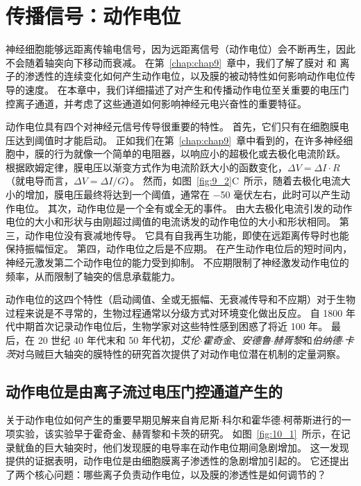 \chapter{传播信号：动作电位} \label{chap:chap10}

神经细胞能够远距离传输电信号，因为远距离信号（动作电位）会不断再生，因此不会随着轴突向下移动而衰减。
在第~\ref{chap:chap9}~章中，我们了解了膜对  和  离子的渗透性的连续变化如何产生动作电位，以及膜的被动特性如何影响动作电位传导的速度。
在本章中，我们详细描述了对产生和传播动作电位至关重要的电压门控离子通道，并考虑了这些通道如何影响神经元电兴奋性的重要特征。


动作电位具有四个对神经元信号传导很重要的特性。
首先，它们只有在细胞膜电压达到阈值时才能启动。
正如我们在第~\ref{chap:chap9}~章中看到的，在许多神经细胞中，膜的行为就像一个简单的电阻器，以响应小的超极化或去极化电流阶跃。
根据欧姆定律，膜电压以渐变方式作为电流阶跃大小的函数变化，$\Delta V = \Delta I \cdot R$（就电导而言，$\Delta V = \Delta I / G$）。
然而，如图~\ref{fig:9_2}C~所示，随着去极化电流大小的增加，膜电压最终将达到一个阈值，通常在 −50 毫伏左右，此时可以产生动作电位。
其次，动作电位是一个全有或全无的事件。
由大去极化电流引发的动作电位的大小和形状与由刚超过阈值的电流诱发的动作电位的大小和形状相同。
第三，动作电位没有衰减地传导。
它具有自我再生功能，即使在远距离传导时也能保持振幅恒定。
第四，动作电位之后是不应期。
在产生动作电位后的短时间内，神经元激发第二个动作电位的能力受到抑制。
不应期限制了神经激发动作电位的频率，从而限制了轴突的信息承载能力。


动作电位的这四个特性（启动阈值、全或无振幅、无衰减传导和不应期）对于生物过程来说是不寻常的，生物过程通常以分级方式对环境变化做出反应。
自 1800 年代中期首次记录动作电位后，生物学家对这些特性感到困惑了将近 100 年。
最后，在 20 世纪 40 年代末和 50 年代初，\textit{艾伦$\cdot$霍奇金}、\textit{安德鲁$\cdot$赫胥黎}和\textit{伯纳德$\cdot$卡茨}对乌贼巨大轴突的膜特性的研究首次提供了对动作电位潜在机制的定量洞察。



\section{动作电位是由离子流过电压门控通道产生的}

关于动作电位如何产生的重要早期见解来自肯尼斯$\cdot$科尔和霍华德$\cdot$柯蒂斯进行的一项实验，该实验早于霍奇金、赫胥黎和卡茨的研究。
如图~\ref{fig:10_1}~所示，在记录鱿鱼的巨大轴突时，他们发现膜的电导率在动作电位期间急剧增加。
这一发现提供的证据表明，动作电位是由细胞膜离子渗透性的急剧增加引起的。
它还提出了两个核心问题：哪些离子负责动作电位，以及膜的渗透性是如何调节的？


